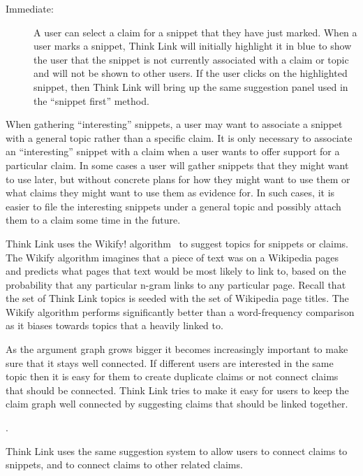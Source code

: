\documentclass{chi2009}
\newcommand{\todo}[1]{}
\begin{document}
\begin{description}
\item[Immediate:] A user can select a claim for a snippet that they have just marked. When a user marks a snippet, Think Link will initially highlight it in blue to show the user that the snippet is not currently associated with a claim or topic and will not be shown to other users. If the user clicks on the highlighted snippet, then Think Link will bring up the same suggestion panel used in the ``snippet first'' method.
\end{description}

When gathering ``interesting'' snippets, a user may want to associate a snippet with a general topic rather than a specific claim. It is only necessary to associate an ``interesting'' snippet with a claim when a user wants to offer support for a particular claim. In some cases a user will gather snippets that they might want to use later, but without concrete plans for how they might want to use them or what claims they might want to use them as evidence for. In such cases, it is easier to file the interesting snippets under a general topic and possibly attach them to a claim some time in the future. 

Think Link uses the Wikify! algorithm~\cite{Mihalcea2007} to suggest topics for snippets or claims. The Wikify algorithm imagines that a piece of text was on a Wikipedia pages and predicts what pages that text would be most likely to link to, based on the probability that any particular n-gram links to any particular page. Recall that the set of Think Link topics is seeded with the set of Wikipedia page titles. The Wikify algorithm performs significantly better than a word-frequency comparison as it biases towards topics that a heavily linked to.

\todo{Mention about topic previewing}

As the argument graph grows bigger it becomes increasingly important to make sure that it stays well connected. If different users are interested in the same topic then it is easy for them to create duplicate claims or not connect claims that should be connected. Think Link tries to make it easy for users to keep the claim graph well connected by suggesting claims that should be linked together.

\todo{Allow two claims to be marked as being identical}.


Think Link uses the same suggestion system to allow users to connect claims to snippets, and to connect claims to other related claims. 
\end{document}
